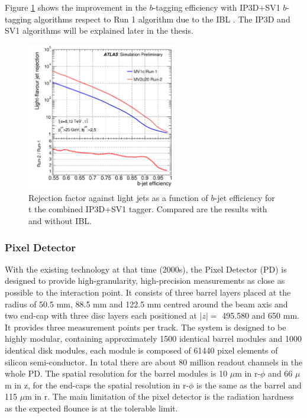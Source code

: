 Figure \ref{fig:chap2:ATLAS:ITK:IBL:Btag} shows the improvement in the $b$-tagging efficiency with IP3D+SV1 $b$-tagging algorithms respect to Run 1 algorithm due to the IBL \cite{IBL_Btag, IBL_Btag2}. The IP3D and SV1 algorithms will be explained later in the thesis.
\begin{figure}[htbp]
    \centering
    \includegraphics[width=0.6\textwidth]{Ch2/Img/IBL_btag2.png}
    \caption{Rejection factor against light jets as a function of $b$-jet efficiency for t the combined IP3D+SV1 tagger. Compared are the results with and without IBL.}
    \label{fig:chap2:ATLAS:ITK:IBL:Btag}
\end{figure}

\subsubsection{Pixel Detector}
\label{chap2:ATLAS:ITK:PD}
With the existing technology at that time (2000s), the Pixel Detector (PD) is designed to provide high-granularity, high-precision measurements as close as possible to the interaction point. It consists of three barrel layers placed at the radius of 50.5 mm, 88.5 mm and 122.5 mm centred around the beam axis and two end-cap with three disc layers each positioned at $|z|=$ 495.580 and 650 mm. It provides three measurement points per track. The system is designed to be highly modular, containing approximately 1500 identical barrel modules and 1000 identical disk modules, each module is composed of 61440 pixel elements of silicon semi-conductor. In total there are about 80 million readout channels in the whole PD. The spatial resolution for the barrel modules is 10 $\mu$m in r-$\phi$ and 66 $\mu$m in z, for the end-caps the spatial resolution in r-$\phi$ is the same as the barrel and 115 $\mu$m in r. The main limitation of the pixel detector is the radiation hardness as the expected flounce is at the tolerable limit. 

